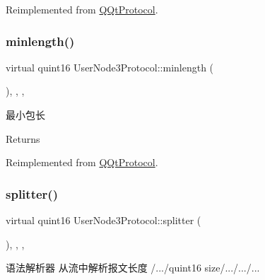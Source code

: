 Reimplemented from \mbox{\hyperlink{class_q_qt_protocol_af41bc3116abbbcfc9af45e151a253ff7}{Q\+Qt\+Protocol}}.

\mbox{\label{class_user_node3_protocol_aa84ec21113d3ba81c978d3737cfeb861}} 
\subsubsection{\texorpdfstring{minlength()}{minlength()}}
{\footnotesize\ttfamily virtual quint16 User\+Node3\+Protocol\+::minlength (\begin{DoxyParamCaption}{ }\end{DoxyParamCaption})\hspace{0.3cm}{\ttfamily [inline]}, {\ttfamily [override]}, {\ttfamily [protected]}, {\ttfamily [virtual]}}



最小包长 

\begin{DoxyReturn}{Returns}

\end{DoxyReturn}


Reimplemented from \mbox{\hyperlink{class_q_qt_protocol_a2b00f53d3dd0eed817eeecff422891f3}{Q\+Qt\+Protocol}}.

\mbox{\label{class_user_node3_protocol_acedafcac18c2a02b5886c0b385740163}} 
\subsubsection{\texorpdfstring{splitter()}{splitter()}}
{\footnotesize\ttfamily virtual quint16 User\+Node3\+Protocol\+::splitter (\begin{DoxyParamCaption}\item[{const Q\+Byte\+Array \&}]{ }\end{DoxyParamCaption})\hspace{0.3cm}{\ttfamily [inline]}, {\ttfamily [override]}, {\ttfamily [protected]}, {\ttfamily [virtual]}}



语法解析器 从流中解析报文长度 /.../quint16 size/.../.../... 


